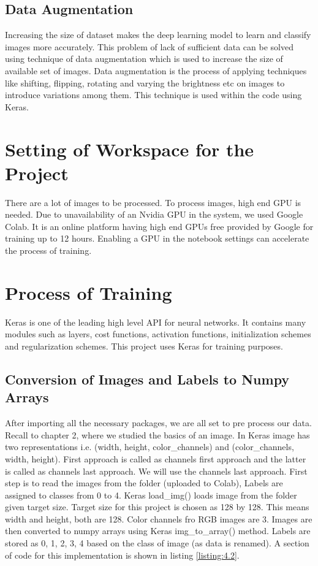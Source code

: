 \subsection{Data Augmentation}
Increasing the size of dataset makes the deep learning model to learn and classify images more accurately. This problem of lack of sufficient data can be solved using technique of data augmentation which is used to increase the size of available set of images.
Data augmentation is the process of applying techniques like shifting, flipping, rotating and varying the brightness etc on images to introduce variations among them.
This technique is used within the code using Keras.
\section{Setting of Workspace for the Project}
There are a lot of images to be processed. To process images, high end GPU is
needed. Due to unavailability of an Nvidia GPU in the system, we used Google Colab.
It is an online platform having high end GPUs free provided by Google for training
up to 12 hours. Enabling a GPU in the notebook settings can accelerate the process of
training.
\section{Process of Training}
Keras is one of the leading high level API for neural networks. It contains
many modules such as layers, cost functions, activation functions, initialization
schemes and regularization schemes. This project uses Keras for training purposes.
\subsection{Conversion of Images and Labels to Numpy Arrays}
After importing all the necessary packages, we are all set to pre process our data.
Recall to chapter 2, where we studied the basics of an image. In Keras image has two
representations i.e. (width, height, color\_channels) and (color\_channels, width, height).
First approach is called as channels first approach and the latter is called as
channels last approach. We will use the channels last approach.
First step is to read the images from the folder (uploaded to Colab),
Labels are assigned to classes from 0 to 4. Keras load\_img() loads image from the folder given
target size. Target size for this project is chosen as 128 by 128. This means width and height,
both are 128. Color channels fro RGB images are 3. Images are then converted to numpy arrays using
Keras img\_to\_array() method. Labels are stored as 0, 1, 2, 3, 4 based on the class of image (as data is renamed).
A section of code for this implementation is shown in listing \ref{listing:4.2}.

